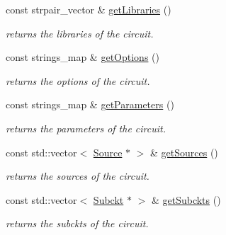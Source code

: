 \begin{DoxyCompactItemize}
const strpair\+\_\+vector \& \mbox{\hyperlink{class_s_p_i_c_e_1_1_circuit_a3e6a71a711e4796470f1a2a1dc42aef6}{get\+Libraries}} ()
\begin{DoxyCompactList}\small\item\em returns the libraries of the circuit. \end{DoxyCompactList}\item 
\mbox{\label{class_s_p_i_c_e_1_1_circuit_a4ee11ef79ef893c5621e0e7d26a7f9a7}} 
const strings\+\_\+map \& \mbox{\hyperlink{class_s_p_i_c_e_1_1_circuit_a4ee11ef79ef893c5621e0e7d26a7f9a7}{get\+Options}} ()
\begin{DoxyCompactList}\small\item\em returns the options of the circuit. \end{DoxyCompactList}\item 
\mbox{\label{class_s_p_i_c_e_1_1_circuit_a4c46676f9ead2db537a0dd963b4f08f1}} 
const strings\+\_\+map \& \mbox{\hyperlink{class_s_p_i_c_e_1_1_circuit_a4c46676f9ead2db537a0dd963b4f08f1}{get\+Parameters}} ()
\begin{DoxyCompactList}\small\item\em returns the parameters of the circuit. \end{DoxyCompactList}\item 
\mbox{\label{class_s_p_i_c_e_1_1_circuit_ac18caa525ed386c44874ee643c88e27b}} 
const std\+::vector$<$ \mbox{\hyperlink{class_s_p_i_c_e_1_1_source}{Source}} $\ast$ $>$ \& \mbox{\hyperlink{class_s_p_i_c_e_1_1_circuit_ac18caa525ed386c44874ee643c88e27b}{get\+Sources}} ()
\begin{DoxyCompactList}\small\item\em returns the sources of the circuit. \end{DoxyCompactList}\item 
\mbox{\label{class_s_p_i_c_e_1_1_circuit_adcc4ca0de68f8ee05f0d5db3b7604930}} 
const std\+::vector$<$ \mbox{\hyperlink{class_s_p_i_c_e_1_1_subckt}{Subckt}} $\ast$ $>$ \& \mbox{\hyperlink{class_s_p_i_c_e_1_1_circuit_adcc4ca0de68f8ee05f0d5db3b7604930}{get\+Subckts}} ()
\begin{DoxyCompactList}\small\item\em returns the subckts of the circuit. \end{DoxyCompactList}\item 

\end{DoxyCompactItemize}
